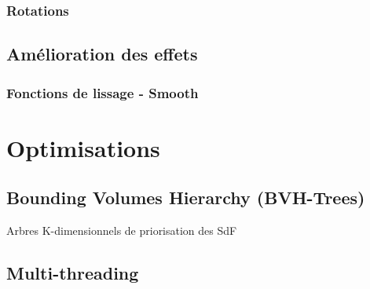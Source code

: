 \documentclass{article}
\begin{document}
\subsubsection{Rotations}

\subsection{Amélioration des effets}
\subsubsection{Fonctions de lissage - Smooth}

\section{Optimisations}
\subsection{Bounding Volumes Hierarchy (BVH-Trees)}
Arbres K-dimensionnels de priorisation des SdF

\subsection{Multi-threading}
\end{document}
